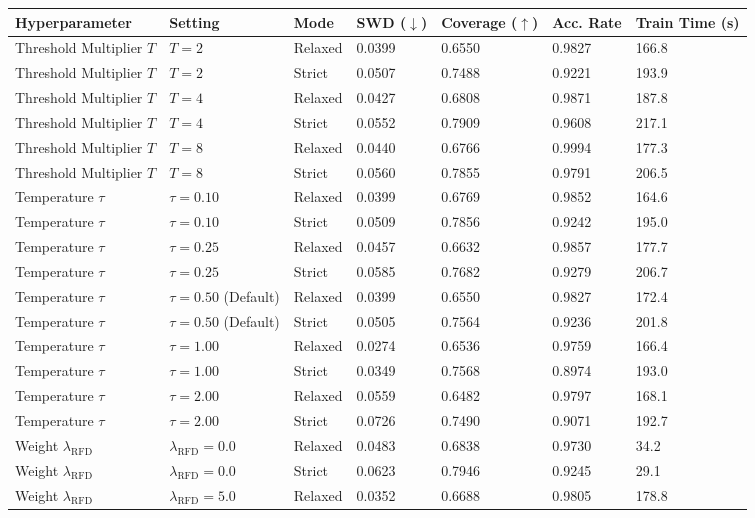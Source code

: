 \begin{tabular}{lllllll}
\toprule
Hyperparameter & Setting & Mode & SWD ($\downarrow$) & Coverage ($\uparrow$) & Acc. Rate & Train Time (s) \\
\midrule
Threshold Multiplier $T$ & $T=2$ & Relaxed & 0.0399 & 0.6550 & 0.9827 & 166.8 \\
Threshold Multiplier $T$ & $T=2$ & Strict & 0.0507 & 0.7488 & 0.9221 & 193.9 \\
Threshold Multiplier $T$ & $T=4$ & Relaxed & 0.0427 & 0.6808 & 0.9871 & 187.8 \\
Threshold Multiplier $T$ & $T=4$ & Strict & 0.0552 & 0.7909 & 0.9608 & 217.1 \\
Threshold Multiplier $T$ & $T=8$ & Relaxed & 0.0440 & 0.6766 & 0.9994 & 177.3 \\
Threshold Multiplier $T$ & $T=8$ & Strict & 0.0560 & 0.7855 & 0.9791 & 206.5 \\
Temperature $\tau$ & $\tau=0.10$ & Relaxed & 0.0399 & 0.6769 & 0.9852 & 164.6 \\
Temperature $\tau$ & $\tau=0.10$ & Strict & 0.0509 & 0.7856 & 0.9242 & 195.0 \\
Temperature $\tau$ & $\tau=0.25$ & Relaxed & 0.0457 & 0.6632 & 0.9857 & 177.7 \\
Temperature $\tau$ & $\tau=0.25$ & Strict & 0.0585 & 0.7682 & 0.9279 & 206.7 \\
Temperature $\tau$ & $\tau=0.50$ (Default) & Relaxed & 0.0399 & 0.6550 & 0.9827 & 172.4 \\
Temperature $\tau$ & $\tau=0.50$ (Default) & Strict & 0.0505 & 0.7564 & 0.9236 & 201.8 \\
Temperature $\tau$ & $\tau=1.00$ & Relaxed & 0.0274 & 0.6536 & 0.9759 & 166.4 \\
Temperature $\tau$ & $\tau=1.00$ & Strict & 0.0349 & 0.7568 & 0.8974 & 193.0 \\
Temperature $\tau$ & $\tau=2.00$ & Relaxed & 0.0559 & 0.6482 & 0.9797 & 168.1 \\
Temperature $\tau$ & $\tau=2.00$ & Strict & 0.0726 & 0.7490 & 0.9071 & 192.7 \\
Weight $\lambda_{\mathrm{RFD}}$ & $\lambda_{\mathrm{RFD}}=0.0$ & Relaxed & 0.0483 & 0.6838 & 0.9730 & 34.2 \\
Weight $\lambda_{\mathrm{RFD}}$ & $\lambda_{\mathrm{RFD}}=0.0$ & Strict & 0.0623 & 0.7946 & 0.9245 & 29.1 \\
Weight $\lambda_{\mathrm{RFD}}$ & $\lambda_{\mathrm{RFD}}=5.0$ & Relaxed & 0.0352 & 0.6688 & 0.9805 & 178.8 \\

\end{tabular}
